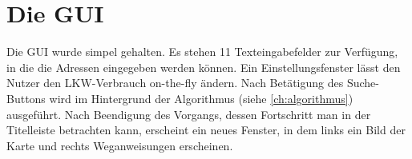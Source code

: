 \chapter{Die GUI}
\label{ch:gui}

Die GUI wurde simpel gehalten. Es stehen 11 Texteingabefelder zur Verfügung, in die die Adressen eingegeben werden können. Ein Einstellungsfenster lässt den Nutzer den LKW-Verbrauch on-the-fly ändern.
Nach Betätigung des Suche-Buttons wird im Hintergrund der Algorithmus (siehe \cref{ch:algorithmus}) ausgeführt. Nach Beendigung des Vorgangs, dessen Fortschritt man in der Titelleiste betrachten kann, erscheint ein neues Fenster, in dem links ein Bild der Karte und rechts Weganweisungen erscheinen.